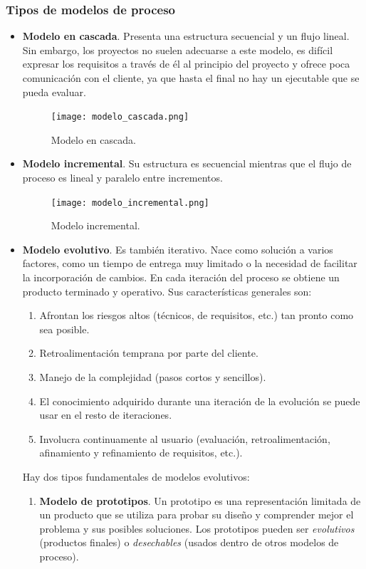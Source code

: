 \documentclass[12pt,spanish]{article}
\begin{document}
\subsubsection{Tipos de modelos de proceso}

\begin{itemize}
	\item \textbf{Modelo en cascada}. Presenta una estructura secuencial y un flujo lineal. Sin embargo, los proyectos no suelen adecuarse a este modelo, es difícil expresar los requisitos a través de él al principio del proyecto y ofrece poca comunicación con el cliente, ya que hasta el final no hay un ejecutable que se pueda evaluar.
		\begin{figure}[H]
			\centering
			\texttt{[image: modelo\_cascada.png]}
			\caption{Modelo en cascada.}
		\end{figure}
	\newpage
	\item \textbf{Modelo incremental}. Su estructura es secuencial mientras  que el flujo de proceso es lineal y paralelo entre incrementos.
			\begin{figure}[H]
			\centering
			\texttt{[image: modelo\_incremental.png]}
			\caption{Modelo incremental.}
		\end{figure}
	\item \textbf{Modelo evolutivo}. Es también iterativo. Nace como solución a varios factores, como un tiempo de entrega muy limitado o la necesidad de facilitar la incorporación de cambios. En cada iteración del proceso se obtiene un producto terminado y operativo. Sus características generales son:
	\begin{enumerate}
		\item Afrontan los riesgos altos (técnicos, de requisitos, etc.) tan pronto como sea posible.
		\item Retroalimentación temprana por parte del cliente.
		\item Manejo de la complejidad (pasos cortos y sencillos).
		\item El conocimiento adquirido durante una iteración de la evolución se puede usar en el resto de iteraciones.
		\item Involucra continuamente al usuario (evaluación, retroalimentación, afinamiento y refinamiento de requisitos, etc.).
	\end{enumerate}
	\newpage
	Hay dos tipos fundamentales de modelos evolutivos:
	\begin{enumerate}
		\item \textbf{Modelo de prototipos}. Un prototipo es una representación limitada de un producto que se utiliza para probar su diseño y comprender mejor el problema y sus posibles soluciones. Los prototipos pueden ser \emph{evolutivos} (productos finales) o \emph{desechables} (usados dentro de otros modelos de proceso).

\end{enumerate}
\end{itemize}
\end{document}
